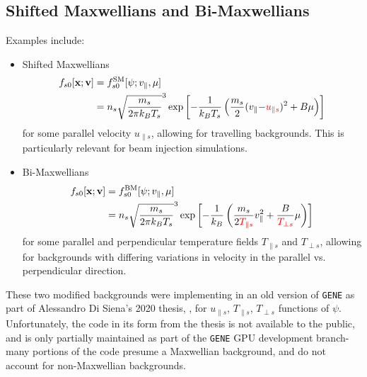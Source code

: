 \subsection{Shifted Maxwellians and Bi-Maxwellians}
    Examples include:
    \begin{itemize}
        \item  Shifted Maxwellians
        \begin{align}
            f_{s0}[\mathbf{x}; \mathbf{v}]  &=  f_{s0}^{\rm SM}[\psi; v_{\parallel}, \mu]  \\
            &=  n_{s}\sqrt{\frac{m_{s}}{2\pi k_{B}T_{s}}}^{3}\exp\left[- \frac{1}{k_{B}T_{s}}\left(\frac{m_{s}}{2}(v_{\parallel} \textcolor{red}{- u_{\parallel s}})^{2} + B\mu\right)\right]
        \end{align}
        for some parallel velocity $u_{\parallel s}$, allowing for travelling backgrounds. This is particularly relevant for beam injection simulations.

        \item  Bi-Maxwellians
        \begin{align}
            f_{s0}[\mathbf{x}; \mathbf{v}]  &=  f_{s0}^{\rm BM}[\psi; v_{\parallel}, \mu]  \\
            &=  n_{s}\sqrt{\frac{m_{s}}{2\pi k_{B}T_{s}}}^{3}\exp\left[- \frac{1}{k_{B}}\left(\frac{m_{s}}{2\textcolor{red}{T_{\parallel s}}}v_{\parallel}^{2} + \frac{B}{\textcolor{red}{T_{\perp s}}}\mu\right)\right]
        \end{align}
        for some parallel and perpendicular temperature fields $T_{\parallel s}$ and $T_{\perp s}$, allowing for backgrounds with differing variations in velocity in the parallel vs. perpendicular direction. 
    \end{itemize}
    These two modified backgrounds were implementing in an old version of {\tt GENE} as part of Alessandro Di Siena's 2020 thesis, \cite{Di20}, for $u_{\parallel s}$, $T_{\parallel s}$, $T_{\perp s}$ functions of $\psi$. Unfortunately, the code in its form from the thesis is not available to the public, and is only partially maintained as part of the {\tt GENE} GPU development branch- many portions of the code presume a Maxwellian background, and do not account for non-Maxwellian backgrounds.
    